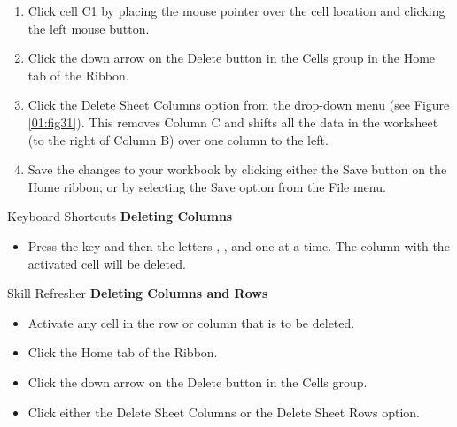 \begin{enumerate}[resume]
	\item Click cell C1 by placing the mouse pointer over the cell location and clicking the left mouse button.
	\item Click the down arrow on the Delete button in the Cells group in the Home tab of the Ribbon.
	\item Click the Delete Sheet Columns option from the drop-down menu (see Figure \ref{01:fig31}). This removes Column C and shifts all the data in the worksheet (to the right of Column B) over one column to the left.
	\item Save the changes to your workbook by clicking either the Save button on the Home ribbon; or by selecting the Save option from the File menu.
\end{enumerate}

\begin{center}
	\begin{shtcutbox}{Keyboard Shortcuts}
		\textbf{Deleting Columns}
		\\
		\begin{itemize}
			\setlength{\itemsep}{0pt}
			\setlength{\parskip}{0pt}
			\setlength{\parsep}{0pt}
			
			\item Press the  key and then the letters , , and  one at a time. The column with the activated cell will be deleted.
			
		\end{itemize}
	\end{shtcutbox}
\end{center}

\begin{center}
	\begin{sklbox}{Skill Refresher}
		\textbf{Deleting Columns and Rows}
		\\
		\begin{itemize}
			\setlength{\itemsep}{0pt}
			\setlength{\parskip}{0pt}
			\setlength{\parsep}{0pt}
			
			\item Activate any cell in the row or column that is to be deleted.
			\item Click the Home tab of the Ribbon.
			\item Click the down arrow on the Delete button in the Cells group.
			\item Click either the Delete Sheet Columns or the Delete Sheet Rows option.
			
		\end{itemize}
	\end{sklbox}
\end{center}

